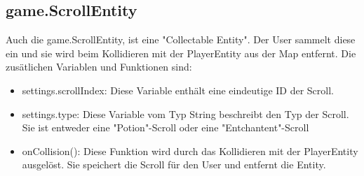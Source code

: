 \subsection{game.ScrollEntity}
\label{ScrollEntity}    
Auch die game.ScrollEntity, ist eine "Collectable Entity". Der User sammelt diese ein und sie wird beim Kollidieren mit der PlayerEntity aus der Map entfernt.
Die zus\"atlichen Variablen und Funktionen sind:
\begin{itemize} 
	\item settings.scrollIndex: Diese Variable enth\"alt eine eindeutige ID der Scroll.
	\item settings.type: Diese Variable vom Typ String beschreibt den Typ der Scroll. Sie ist entweder eine  "Potion"-Scroll oder eine "Entchantent"-Scroll
	\item onCollision(): Diese Funktion wird durch das Kollidieren mit der PlayerEntity ausgel\"ost. Sie speichert die Scroll f\"ur den User und entfernt die Entity. 
\end{itemize}                      

